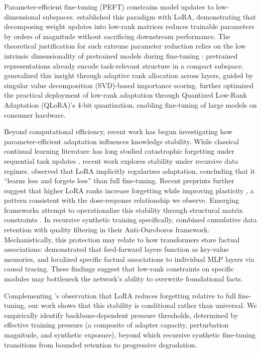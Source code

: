 \documentclass[a4paper,fleqn]{cas-dc}
\newif\ifshowchanges
\newcommand{\rev}[1]{\ifshowchanges{\color{blue}#1}\else{#1}\fi}
\begin{document}
Parameter-efficient fine-tuning (PEFT) constrains model updates to
low-dimensional subspaces. \citet{hu2022} established this paradigm with LoRA,
demonstrating that decomposing weight updates into low-rank matrices reduces
trainable parameters by orders of magnitude without sacrificing downstream
performance. The theoretical justification for such extreme parameter reduction
relies on the low intrinsic dimensionality of pretrained models during
fine-tuning \citep{aghajanyan2021}: pretrained representations already encode
task-relevant structure in a compact subspace. \citet{zhang2023adalora}
generalized this insight through adaptive rank allocation across layers, guided
by \rev{singular value decomposition (SVD)}-based importance scoring. \citet{dettmers2023} further optimized the
practical deployment of low-rank adaptation through \rev{Quantized Low-Rank Adaptation (QLoRA)}'s 4-bit quantization,
enabling fine-tuning of large models on consumer hardware.

Beyond computational efficiency, recent work has begun investigating how
parameter-efficient adaptation influences knowledge stability. While classical
continual learning literature has long studied catastrophic forgetting under
sequential task updates \citep{kirkpatrick2017,delange2022,shi2024continualllm}, recent work
explores stability under recursive data regimes. \citet{biderman2024} observed
that LoRA implicitly regularizes adaptation, concluding that it ``learns less
and forgets less'' than full fine-tuning. Recent preprints further suggest that
higher LoRA ranks increase forgetting while improving plasticity
\citep{soutifcormerais2024forgetting,ding2024ranktrade},
a pattern consistent with the dose-response relationship we observe. Emerging
frameworks attempt to operationalize this stability through structural matrix
constraints \citep{fawi2024curlora}. In
recursive synthetic training specifically, \citet{adapala2025} combined
cumulative data retention with quality filtering in their Anti-Ouroboros
framework. Mechanistically, this protection may relate to how transformers
store factual associations: \citet{geva2021} demonstrated that feed-forward
layers function as key-value memories, and \citet{meng2022locating} localized
specific factual associations to individual MLP layers via causal tracing. These
findings suggest that low-rank constraints on specific modules may bottleneck
the network's ability to overwrite foundational facts.

Complementing \citet{biderman2024}'s observation that LoRA reduces forgetting
relative to full fine-tuning, our work shows that this stability is conditional
rather than universal. We empirically identify backbone-dependent pressure
thresholds, determined by effective training pressure (a composite of adapter
capacity, perturbation magnitude, and synthetic exposure), beyond which
recursive synthetic fine-tuning transitions from bounded retention to
progressive degradation.
\end{document}
